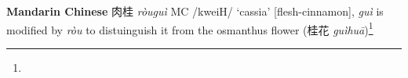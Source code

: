 \begin{etymology}\label{ety:rougui}
\textbf{Mandarin Chinese} {肉桂} \textit{ròuguì} MC /kweiH/ `cassia' [flesh-cinnamon], \textit{guì} is modified by \textit{ròu} to distuinguish it from the osmanthus flower (桂花 \textit{guìhuā})\footnote{}
\end{etymology}